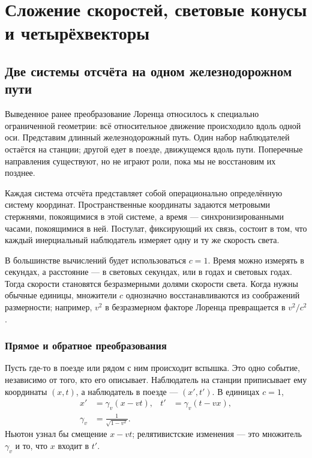 \chapter{Сложение скоростей, световые конусы и четырёхвекторы}

\section{Две системы отсчёта на одном железнодорожном пути}

Выведенное ранее преобразование Лоренца относилось к специально ограниченной геометрии: всё относительное движение происходило вдоль одной оси. Представим длинный железнодорожный путь. Один набор наблюдателей остаётся на станции; другой едет в поезде, движущемся вдоль пути. Поперечные направления существуют, но не играют роли, пока мы не восстановим их позднее.

Каждая система отсчёта представляет собой операционально определённую систему координат. Пространственные координаты задаются метровыми стержнями, покоящимися в этой системе, а время — синхронизированными часами, покоящимися в ней. Постулат, фиксирующий их связь, состоит в том, что каждый инерциальный наблюдатель измеряет одну и ту же скорость света.

В большинстве вычислений будет использоваться \(c=1\). Время можно измерять в секундах, а расстояние — в световых секундах, или в годах и световых годах. Тогда скорости становятся безразмерными долями скорости света. Когда нужны обычные единицы, множители \(c\) однозначно восстанавливаются из соображений размерности; например, \(v^2\) в безразмерном факторе Лоренца превращается в \(v^2/c^2\).

\subsection{Прямое и обратное преобразования}

Пусть где-то в поезде или рядом с ним происходит вспышка. Это одно событие, независимо от того, кто его описывает. Наблюдатель на станции приписывает ему координаты \((x,t)\), а наблюдатель в поезде — \((x',t')\). В единицах \(c=1\),
\begin{align}
x'&=\gamma_v(x-vt),&
t'&=\gamma_v(t-vx),
\label{eq:sr2-direct}\\
\gamma_v&=\frac{1}{\sqrt{1-v^2}}.
\end{align}
Ньютон узнал бы смещение \(x-vt\); релятивистские изменения — это множитель \(\gamma_v\) и то, что \(x\) входит в \(t'\).

